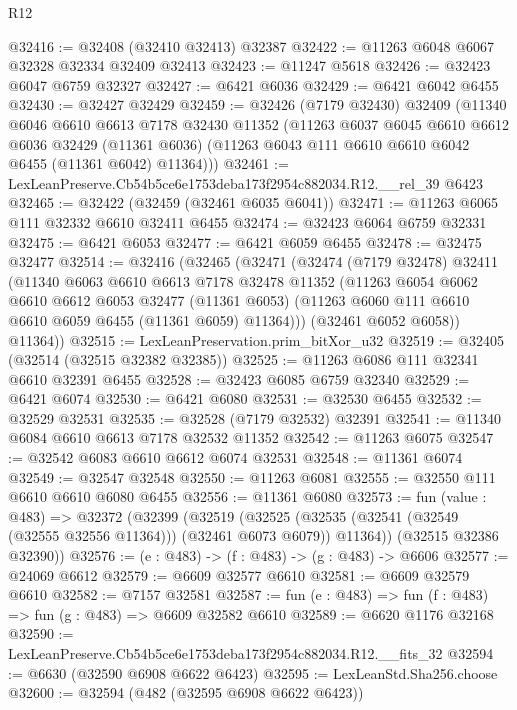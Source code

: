\begin{lexlean}{R12}
\begin{coremodule}
@32416 := @32408 (@32410 @32413) @32387
@32422 := @11263 @6048 @6067 @32328 @32334 @32409 @32413
@32423 := @11247 @5618
@32426 := @32423 @6047 @6759 @32327
@32427 := @6421 @6036
@32429 := @6421 @6042 @6455
@32430 := @32427 @32429
@32459 := @32426
    (@7179 @32430)
    @32409
    (@11340
      @6046
      @6610
      @6613
      @7178
      @32430
      @11352
      (@11263
        @6037
        @6045
        @6610
        @6612
        @6036
        @32429
        (@11361 @6036)
        (@11263 @6043 @111 @6610 @6610 @6042 @6455 (@11361 @6042) @11364)))
@32461 := LexLeanPreserve.Cb54b5ce6e1753deba173f2954c882034.R12.__rel_39 @6423
@32465 := @32422 (@32459 (@32461 @6035 @6041))
@32471 := @11263 @6065 @111 @32332 @6610 @32411 @6455
@32474 := @32423 @6064 @6759 @32331
@32475 := @6421 @6053
@32477 := @6421 @6059 @6455
@32478 := @32475 @32477
@32514 := @32416
    (@32465
      (@32471
        (@32474
          (@7179 @32478)
          @32411
          (@11340
            @6063
            @6610
            @6613
            @7178
            @32478
            @11352
            (@11263
              @6054
              @6062
              @6610
              @6612
              @6053
              @32477
              (@11361 @6053)
              (@11263 @6060 @111 @6610 @6610 @6059 @6455 (@11361 @6059) @11364)))
          (@32461 @6052 @6058))
        @11364))
@32515 := LexLeanPreservation.prim_bitXor_u32
@32519 := @32405 (@32514 (@32515 @32382 @32385))
@32525 := @11263 @6086 @111 @32341 @6610 @32391 @6455
@32528 := @32423 @6085 @6759 @32340
@32529 := @6421 @6074
@32530 := @6421 @6080
@32531 := @32530 @6455
@32532 := @32529 @32531
@32535 := @32528 (@7179 @32532) @32391
@32541 := @11340 @6084 @6610 @6613 @7178 @32532 @11352
@32542 := @11263 @6075
@32547 := @32542 @6083 @6610 @6612 @6074 @32531
@32548 := @11361 @6074
@32549 := @32547 @32548
@32550 := @11263 @6081
@32555 := @32550 @111 @6610 @6610 @6080 @6455
@32556 := @11361 @6080
@32573 := fun (value : @483) =>
  @32372
    (@32399
      (@32519
        (@32525 (@32535 (@32541 (@32549 (@32555 @32556 @11364))) (@32461 @6073 @6079)) @11364))
      (@32515 @32386 @32390))
@32576 := (e : @483) -> (f : @483) -> (g : @483) -> @6606
@32577 := @24069 @6612
@32579 := @6609 @32577 @6610
@32581 := @6609 @32579 @6610
@32582 := @7157 @32581
@32587 := fun (e : @483) => fun (f : @483) => fun (g : @483) => @6609 @32582 @6610
@32589 := @6620 @1176 @32168
@32590 := LexLeanPreserve.Cb54b5ce6e1753deba173f2954c882034.R12.__fits_32
@32594 := @6630 (@32590 @6908 @6622 @6423)
@32595 := LexLeanStd.Sha256.choose
@32600 := @32594 (@482 (@32595 @6908 @6622 @6423))

\end{coremodule}
\end{lexlean}

